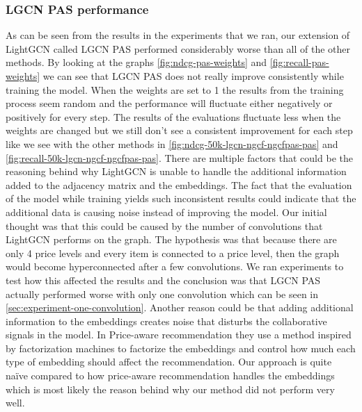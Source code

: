 \subsubsection{LGCN PAS performance}
As can be seen from the results in the experiments that we ran, our extension of LightGCN called LGCN PAS performed considerably worse than all of the other methods.
By looking at the graphs \autoref{fig:ndcg-pas-weights} and \autoref{fig:recall-pas-weights} we can see that LGCN PAS does not really improve consistently while training the model.
When the weights are set to 1 the results from the training process seem random and the performance will fluctuate either negatively or positively for every step.
The results of the evaluations fluctuate less when the weights are changed but we still don't see a consistent improvement for each step like we see with the other methods in \autoref{fig:ndcg-50k-lgcn-ngcf-ngcfpas-pas} and \autoref{fig:recall-50k-lgcn-ngcf-ngcfpas-pas}.
There are multiple factors that could be the reasoning behind why LightGCN is unable to handle the additional information added to the adjacency matrix and the embeddings.
The fact that the evaluation of the model while training yields such inconsistent results could indicate that the additional data is causing noise instead of improving the model. 
Our initial thought was that this could be caused by the number of convolutions that LightGCN performs on the graph.
The hypothesis was that because there are only 4 price levels and every item is connected to a price level, then the graph would become hyperconnected after a few convolutions.
We ran experiments to test how this affected the results and the conclusion was that LGCN PAS actually performed worse with only one convolution which can be seen in \autoref{sec:experiment-one-convolution}.
Another reason could be that adding additional information to the embeddings creates noise that disturbs the collaborative signals in the model.
In Price-aware recommendation they use a method inspired by factorization machines to factorize the embeddings and control how much each type of embedding should affect the recommendation.
Our approach is quite naïve compared to how price-aware recommendation handles the embeddings which is most likely the reason behind why our method did not perform very well.
